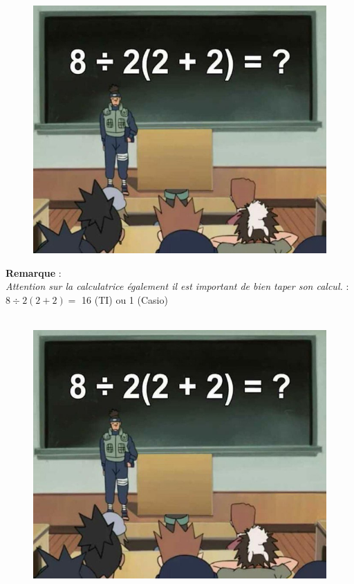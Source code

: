 \begin{figure}[H]
      \centering
      \includegraphics[width=0.4\linewidth]{5x1-calculer/naruto.png}
\end{figure}




\textbf{Remarque} : \\
\textit{Attention sur la calculatrice également il est important de bien taper son calcul. } : $8 \div 2(2+2) =$ 16 (TI) ou 1 (Casio)

\begin{figure}[H]
      \centering
      \includegraphics[width=0.4\linewidth]{5x1-calculer/naruto.png}
\end{figure}



